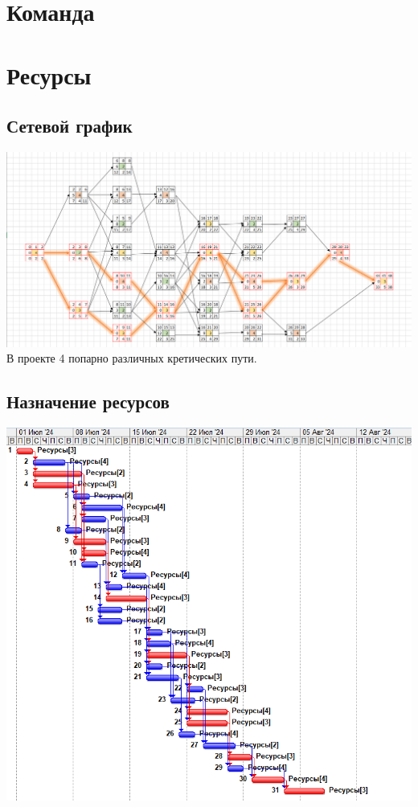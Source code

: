 \documentclass[14pt]{article}
\begin{document}

\clearpage
\tableofcontents
\clearpage
\section{Команда}
\section{Ресурсы}
	\subsection{Сетевой график}
	\includegraphics[width=\textwidth]{../img/init_network_graph.png}\\
	В проекте 4 попарно различных кретических пути.
	\subsection{Назначение ресурсов}
	\includegraphics[width=\textwidth]{../img/init_resource_manage.png}
\end{document}
